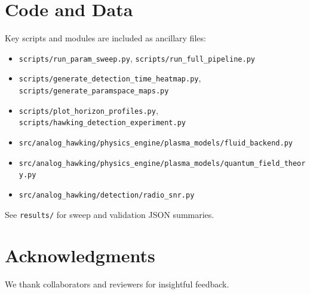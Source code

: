 \documentclass[11pt]{article}
\begin{document}
\section{Code and Data}
Key scripts and modules are included as ancillary files:
\begin{itemize}
  \item \texttt{scripts/run\_param\_sweep.py}, \texttt{scripts/run\_full\_pipeline.py}
  \item \texttt{scripts/generate\_detection\_time\_heatmap.py}, \texttt{scripts/generate\_paramspace\_maps.py}
  \item \texttt{scripts/plot\_horizon\_profiles.py}, \texttt{scripts/hawking\_detection\_experiment.py}
  \item \texttt{src/analog\_hawking/physics\_engine/plasma\_models/fluid\_backend.py}
  \item \texttt{src/analog\_hawking/physics\_engine/plasma\_models/quantum\_field\_theory.py}
  \item \texttt{src/analog\_hawking/detection/radio\_snr.py}
\end{itemize}
See \texttt{results/} for sweep and validation JSON summaries.

\section*{Acknowledgments}
We thank collaborators and reviewers for insightful feedback.



\end{document}
